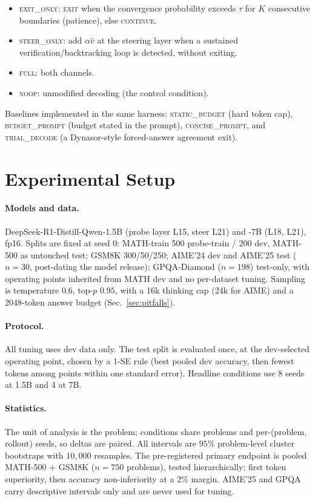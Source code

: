 \begin{itemize}
\itemsep2pt
\item \textsc{exit\_only}: \textsc{exit} when the convergence probability
exceeds $\tau$ for $K$ consecutive boundaries (patience), else \textsc{continue}.
\item \textsc{steer\_only}: add $\alpha \hat{v}$ at the steering layer when a
sustained verification/backtracking loop is detected, without exiting.
\item \textsc{full}: both channels.
\item \textsc{noop}: unmodified decoding (the control condition).
\end{itemize}

Baselines implemented in the same harness: \textsc{static\_budget} (hard token
cap), \textsc{budget\_prompt} (budget stated in the prompt),
\textsc{concise\_prompt}, and \textsc{trial\_decode} (a Dynasor-style
forced-answer agreement exit).

\section{Experimental Setup}

\paragraph{Models and data.} DeepSeek-R1-Distill-Qwen-1.5B (probe layer L15,
steer L21) and -7B (L18, L21), fp16. Splits are fixed at seed 0: MATH-train
500 probe-train / 200 dev, MATH-500 as untouched test; GSM8K 300/50/250;
AIME'24 dev and AIME'25 test ($n{=}30$, post-dating the model release);
GPQA-Diamond ($n{=}198$) test-only, with operating points inherited from MATH
dev and no per-dataset tuning. Sampling is temperature $0.6$, top-$p$ $0.95$,
with a 16k thinking cap (24k for AIME) and a 2048-token answer budget
(Sec.~\ref{sec:pitfalls}).

\paragraph{Protocol.} All tuning uses dev data only. The test split is
evaluated once, at the dev-selected operating point, chosen by a 1-SE rule
(best pooled dev accuracy, then fewest tokens among points within one standard
error). Headline conditions use 8 seeds at 1.5B and 4 at 7B.

\paragraph{Statistics.} The unit of analysis is the problem; conditions share
problems and per-(problem, rollout) seeds, so deltas are paired. All intervals
are $95\%$ problem-level cluster bootstraps with $10{,}000$ resamples. The
pre-registered primary endpoint is pooled MATH-500 + GSM8K ($n{=}750$
problems), tested hierarchically: first token superiority, then accuracy
non-inferiority at a $2\%$ margin. AIME'25 and GPQA carry descriptive
intervals only and are never used for tuning.


